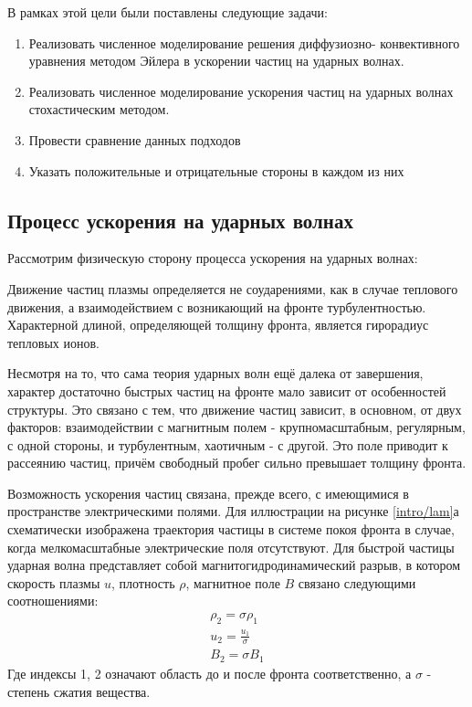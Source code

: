 \documentclass[a4paper,14pt]{extarticle} %
\begin{document}
В рамках этой цели были поставлены следующие задачи:
\begin{enumerate}
\item Реализовать численное моделирование решения диффузиозно- конвективного уравнения методом Эйлера в ускорении частиц на ударных волнах.
\item Реализовать численное моделирование ускорения частиц на ударных волнах стохастическим методом.
\item Провести сравнение данных подходов
\item Указать положительные и отрицательные стороны в каждом из них
\end{enumerate}

\subsection{Процесс ускорения на ударных волнах}
Рассмотрим физическую сторону процесса ускорения на ударных волнах:

Движение частиц плазмы определяется не соударениями, как в случае теплового движения, а взаимодействием с возникающий на фронте турбулентностью. Характерной длиной, определяющей толщину фронта, является гирорадиус тепловых ионов.

Несмотря на то, что сама теория ударных волн ещё далека от завершения, характер достаточно быстрых частиц на фронте мало зависит от особенностей структуры. Это связано с тем, что движение частиц зависит, в основном, от двух факторов: взаимодействии с магнитным полем - крупномасштабным, регулярным, с одной стороны, и турбулентным, хаотичным - с другой. Это поле приводит к рассеянию частиц, причём свободный пробег сильно превышает толщину фронта.

Возможность ускорения частиц связана, прежде всего, с имеющимися в пространстве электрическими полями. Для иллюстрации на рисунке \ref{intro/lam}а схематически изображена траектория частицы в системе покоя фронта в случае, когда мелкомасштабные электрические поля отсутствуют. Для быстрой частицы ударная волна представляет собой магнитогидродинамический разрыв, в котором скорость плазмы $u$, плотность $\rho$, магнитное поле $B$ связано следующими соотношениями:
\begin{eqnarray}
\rho_2 = \sigma \rho_1\\
u_2=\frac{u_1}{\sigma}\\
B_2=\sigma B_1
\end{eqnarray}
Где индексы 1, 2 означают область до и после фронта соответственно, а $\sigma$ - степень сжатия вещества.
\end{document}
